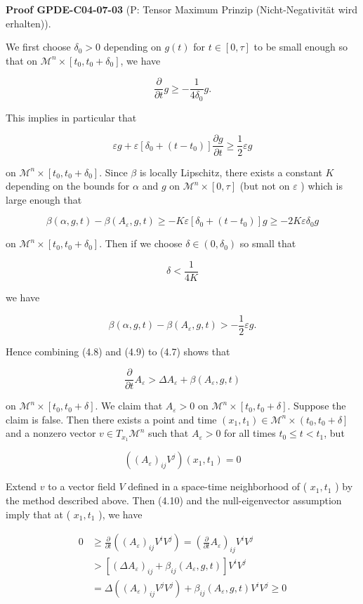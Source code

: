 \documentclass[10pt, letterpaper]{article}
\newcommand{\CustomHeading}[3]{%
  \par\medskip\noindent%
  \textbf{#1 #2} \textnormal{(#3)}.\enskip%
}
\newenvironment{PROOF}[2]{\begin{unitbox}\CustomHeading{Proof}{#1}{#2}}{\end{unitbox}}
\begin{document}
\begin{PROOF}{GPDE-C04-07-03}{P: Tensor Maximum Prinzip (Nicht-Negativität wird erhalten)}
We first choose $\delta_0>0$ depending on $g(t)$ for $t \in[0, \tau]$ to be small enough so that on $\mathcal{M}^n \times\left[t_0, t_0+\delta_0\right]$, we have

$$
\frac{\partial}{\partial t} g \geq-\frac{1}{4 \delta_0} g .
$$


This implies in particular that

$$
\varepsilon g+\varepsilon\left[\delta_0+\left(t-t_0\right)\right] \frac{\partial g}{\partial t} \geq \frac{1}{2} \varepsilon g
$$

on $\mathcal{M}^n \times\left[t_0, t_0+\delta_0\right]$. Since $\beta$ is locally Lipschitz, there exists a constant $K$ depending on the bounds for $\alpha$ and $g$ on $\mathcal{M}^n \times[0, \tau]$ (but not on $\varepsilon$ ) which is large enough that

$$
\beta(\alpha, g, t)-\beta\left(A_{\varepsilon}, g, t\right) \geq-K \varepsilon\left[\delta_0+\left(t-t_0\right)\right] g \geq-2 K \varepsilon \delta_0 g
$$

on $\mathcal{M}^n \times\left[t_0, t_0+\delta_0\right]$. Then if we choose $\delta \in\left(0, \delta_0\right)$ so small that

$$
\delta<\frac{1}{4 K}
$$

we have

$$
\beta(\alpha, g, t)-\beta\left(A_{\varepsilon}, g, t\right)>-\frac{1}{2} \varepsilon g .
$$


Hence combining (4.8) and (4.9) to (4.7) shows that

$$
\frac{\partial}{\partial t} A_{\varepsilon}>\Delta A_{\varepsilon}+\beta\left(A_{\varepsilon}, g, t\right)
$$

on $\mathcal{M}^n \times\left[t_0, t_0+\delta\right]$. We claim that $A_{\varepsilon}>0$ on $\mathcal{M}^n \times\left[t_0, t_0+\delta\right]$. Suppose the claim is false. Then there exists a point and time $\left(x_1, t_1\right) \in \mathcal{M}^n \times\left(t_0, t_0+\delta\right]$ and a nonzero vector $v \in T_{x_1} \mathcal{M}^n$ such that $A_{\varepsilon}>0$ for all times $t_0 \leq t<t_1$, but

$$
\left(\left(A_{\varepsilon}\right)_{i j} V^j\right)\left(x_1, t_1\right)=0
$$


Extend $v$ to a vector field $V$ defined in a space-time neighborhood of ( $x_1, t_1$ ) by the method described above. Then (4.10) and the null-eigenvector assumption imply that at ( $x_1, t_1$ ), we have

$$
\begin{aligned}
0 & \geq \frac{\partial}{\partial t}\left(\left(A_{\varepsilon}\right)_{i j} V^i V^j\right)=\left(\frac{\partial}{\partial t} A_{\varepsilon}\right)_{i j} V^i V^j \\
& >\left[\left(\Delta A_{\varepsilon}\right)_{i j}+\beta_{i j}\left(A_{\varepsilon}, g, t\right)\right] V^i V^j \\
& =\Delta\left(\left(A_{\varepsilon}\right)_{i j} V^j V^j\right)+\beta_{i j}\left(A_{\varepsilon}, g, t\right) V^i V^j \geq 0
\end{aligned}
$$



\end{PROOF}
\end{document}
